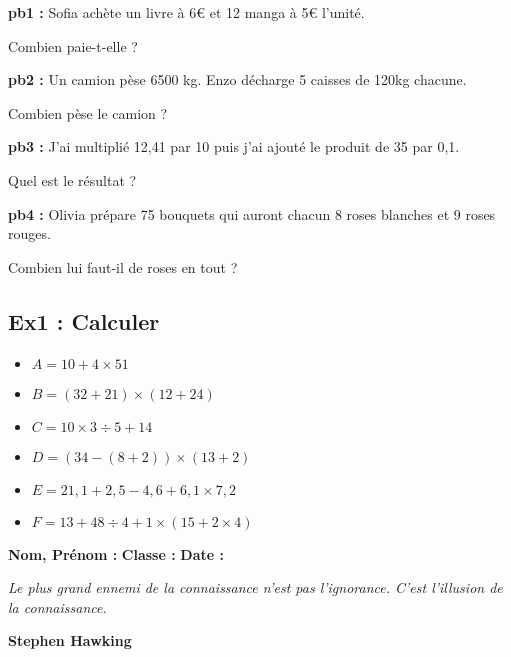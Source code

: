 \textbf{pb1 : }
Sofia achète un livre à 6€ et 12 manga à 5€ l'unité. 

Combien paie-t-elle ?  \\ \Pointilles[5]

\textbf{pb2 : }
Un camion pèse 6500 kg. Enzo décharge 5 caisses de 120kg chacune. 

Combien pèse le camion ? \\ \Pointilles[5] 

\textbf{pb3 : }
\og J'ai multiplié 12,41 par 10 puis j'ai ajouté le produit de 35 par 0,1.\fg 

Quel est le résultat ? \\ \Pointilles[5]

\textbf{pb4 : }
Olivia prépare 75 bouquets qui auront chacun 8 roses blanches et 9 roses rouges.

Combien lui faut-il de roses en tout ? \\ \Pointilles[5]

\newpage

\subsection*{Ex1 : Calculer}

\begin{multicols}{3}\begin{itemize}[label={$\bullet$}]
  \item $A = 10 + 4 \times 51$ 
  \item $B = (32 + 21) \times (12 + 24)$
  \item $C = 10 \times 3 \div 5 + 14$
  \item $D = (34 - (8 + 2)) \times (13 + 2)$
  \item $E = 21,1 + 2,5 - 4,6 + 6,1 \times 7,2$
  \item $F = 13 + 48 \div 4 + 1 \times (15 + 2 \times 4)$
\end{itemize}\end{multicols}

\Pointilles[48]

\newpage 

\textbf{Nom, Prénom :} \hspace{8cm} \textbf{Classe :} \hspace{3cm} \textbf{Date :}\\

\begin{center}
  \textit{Le plus grand ennemi de la connaissance n'est pas l'ignorance. C'est l'illusion de la connaissance.} 
  
  \textbf{Stephen Hawking}
\end{center}

